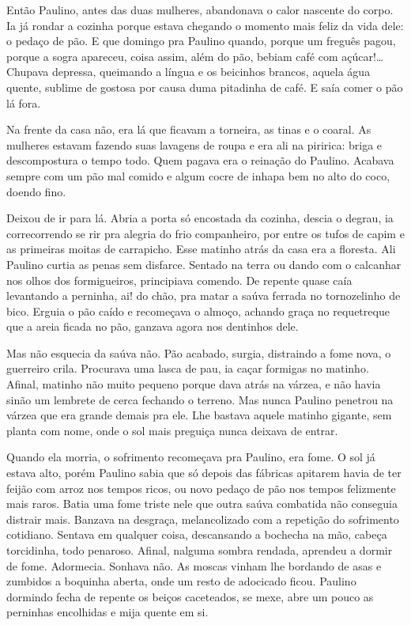 Então Paulino, antes das duas mulheres, abandonava o calor nascente do
corpo. Ia já rondar a cozinha porque estava chegando o momento mais
feliz da vida dele: o pedaço de pão. E que domingo pra Paulino quando,
porque um freguês pagou, porque a sogra apareceu, coisa assim, além do
pão, bebiam café com açúcar!\ldots{} Chupava depressa, queimando a língua e
os beicinhos brancos, aquela água quente, sublime de gostosa por causa
duma pitadinha de café. E saía comer o pão lá fora.

Na frente da casa não, era lá que ficavam a torneira, as tinas e o
coaral. As mulheres estavam fazendo suas lavagens de roupa e era ali na
piririca: briga e descompostura o tempo todo. Quem pagava era o reinação
do Paulino. Acabava sempre com um pão mal comido e algum cocre de inhapa
bem no alto do coco, doendo fino.

Deixou de ir para lá. Abria a porta só encostada da cozinha, descia o
degrau, ia correcorrendo se rir pra alegria do frio companheiro, por
entre os tufos de capim e as primeiras moitas de carrapicho. Esse
matinho atrás da casa era a floresta. Ali Paulino curtia as penas sem
disfarce. Sentado na terra ou dando com o calcanhar nos olhos dos
formigueiros, principiava comendo. De repente quase caía levantando a
perninha, ai! do chão, pra matar a saúva ferrada no tornozelinho de
bico. Erguia o pão caído e recomeçava o almoço, achando graça no
requetreque que a areia ficada no pão, ganzava agora nos dentinhos dele.

Mas não esquecia da saúva não. Pão acabado, surgia, distraindo a fome
nova, o guerreiro crila. Procurava uma lasca de pau, ia caçar formigas
no matinho. Afinal, matinho não muito pequeno porque dava atrás na
várzea, e não havia sinão um lembrete de cerca fechando o terreno. Mas
nunca Paulino penetrou na várzea que era grande demais pra ele. Lhe
bastava aquele matinho gigante, sem planta com nome, onde o sol mais
preguiça nunca deixava de entrar.


Quando ela morria, o sofrimento recomeçava pra Paulino, era fome. O sol
já estava alto, porém Paulino sabia que só depois das fábricas apitarem
havia de ter feijão com arroz nos tempos ricos, ou novo pedaço de pão
nos tempos felizmente mais raros. Batia uma fome triste nele que outra
saúva combatida não conseguia distrair mais. Banzava na desgraça,
melancolizado com a repetição do sofrimento cotidiano. Sentava em
qualquer coisa, descansando a bochecha na mão, cabeça torcidinha, todo
penaroso. Afinal, nalguma sombra rendada, aprendeu a dormir de fome.
Adormecia. Sonhava não. As moscas vinham lhe bordando de asas e zumbidos
a boquinha aberta, onde um resto de adocicado ficou. Paulino dormindo
fecha de repente os beiços caceteados, se mexe, abre um pouco as
perninhas encolhidas e mija quente em si.

